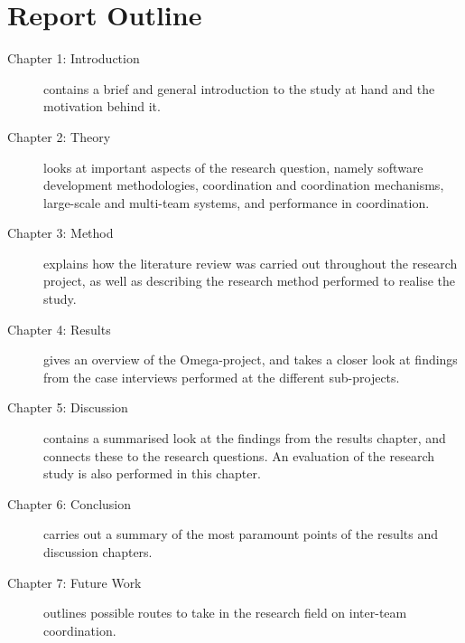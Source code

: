 \section{Report Outline}

\begin{description}
    \item[Chapter 1: Introduction] contains a brief and general introduction to the study at hand and the motivation behind it.
    \item[Chapter 2: Theory] looks at important aspects of the research question, namely software development methodologies, coordination and coordination mechanisms, large-scale and multi-team systems, and performance in coordination.
    \item[Chapter 3: Method] explains how the literature review was carried out throughout the research project, as well as describing the research method performed to realise the study.
    \item[Chapter 4: Results] gives an overview of the Omega-project, and takes a closer look at findings from the case interviews performed at the different sub-projects.
    \item[Chapter 5: Discussion] contains a summarised look at the findings from the results chapter, and connects these to the research questions. An evaluation of the research study is also performed in this chapter.
    \item[Chapter 6: Conclusion] carries out a summary of the most paramount points of the results and discussion chapters.
    \item[Chapter 7: Future Work] outlines possible routes to take in the research field on inter-team coordination.
\end{description}